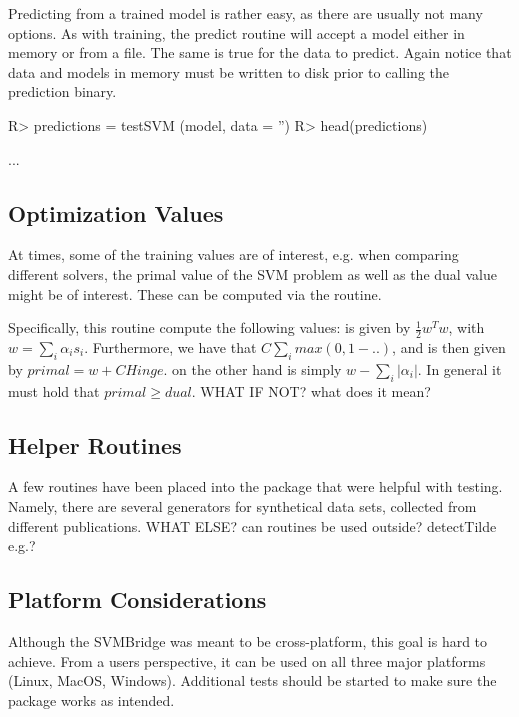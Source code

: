 \documentclass[article, shortnames]{jss}
\begin{document}
Predicting from a trained model is rather easy, as there are usually not many options.
As with training, the predict routine will accept a model either in memory or from a file.
The same is true for the data to predict.  Again notice that data and models in memory 
must be written to disk prior to calling the prediction binary.

\begin{CodeChunk}
\begin{CodeInput}
R> predictions = testSVM (model, data = '')
R> head(predictions)
\end{CodeInput}
\begin{CodeOutput}
...
\end{CodeOutput}
\end{CodeChunk}


\subsection{Optimization Values}

At times, some of the training values are of interest,
e.g. when comparing different solvers, the primal value
of the SVM problem as well as the dual value might  be of interest.
These can be computed via the  routine.

Specifically, this routine compute the following values:
 is given by $\frac{1}{2} w^T w$, with
$w = \sum_i \alpha_i s_i$. Furthermore, we have
that $C \sum_i max (0, 1 - ..) $, and 
 is then given by $primal = w + CHinge$.
 on the other hand is simply
$w - \sum_i |\alpha_i|$. In general it must hold
that $primal \geq dual$. 
WHAT IF NOT? what does it mean?


\subsection{Helper Routines}

A few routines have been placed into the package that were helpful
with testing. Namely, there are several generators for synthetical data sets,
collected from different publications. 
WHAT ELSE? can routines be used outside? detectTilde e.g.?


\subsection{Platform Considerations}

Although the SVMBridge was meant to be cross-platform, this goal
is hard to achieve. From a users perspective, it can be used on all three
major platforms (Linux, MacOS, Windows). Additional tests should
be started to make sure the package works as intended.
\end{document}
